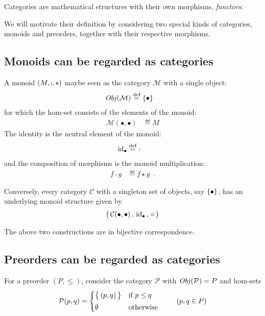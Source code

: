 Categories are mathematical structures with their own morphisms,
\emph{functors}:
\begin{center}
\end{center}
We will motivate their definition by considering two special kinds of
categories, monoids and preorders, together with their respective morphisms.

\subsection{Monoids can be regarded as categories}

A monoid $(M, \shortmid, \star)$ maybe seen as the category $\mathcal M$ with
a single object:
\begin{align*}
\operatorname{\mathit{Obj}}(\mathcal M) &\stackrel{\text{def}}{=} \{  \bullet  \}
\end{align*}
for which the hom-set consists of the elements of the monoid:
\begin{align*}
\mathcal{M}(\bullet, \bullet) &\eqdef M
\end{align*}
The identity is the neutral element of the monoid:
\begin{align*}
\mathrm{id}_{ \bullet } &\stackrel{\text{def}}{=}\ \shortmid
\end{align*}
and the composition of morphisms is the monoid multiplication:
\begin{align*}
f \comp g &\eqdef f \star g
\enspace.
\end{align*}

Conversely, every category $\mathcal C$ with a singleton set of objects, say
$\{ \bullet \}$, has an underlying monoid structure given by
\[
  \big(\, \mathcal{C}(\bullet,\bullet) \,,\, \mathrm{id}_{ \bullet } \,,\, \circ \,\big)
\]

The above two constructions are in bijective correspondence.

\subsection{Preorders can be regarded as categories}

For a preorder $(P, \leq)$, consider the category $\mathcal P$ with
$\operatorname{\mathit{Obj}}(\mathcal P) = P$ and hom-sets
\[
\mathcal{P}(p, q)
= \begin{cases}
    \big\{ \, (p,q) \, \big\} & \text{if } p \leq q
    \\[1mm]
    \emptyset & \text{otherwise }
  \end{cases}
\qquad
(p,q \in P)
\]


